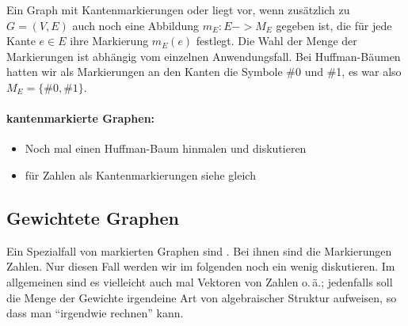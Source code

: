 Ein Graph mit Kantenmarkierungen oder  liegt vor, wenn zusätzlich zu
$G=(V,E)$ auch noch eine Abbildung $m_E:E->M_E$ gegeben ist, die für
jede Kante $e\in E$ ihre Markierung $m_E(e)$ festlegt.
% 
Die Wahl der Menge der Markierungen ist abhängig vom einzelnen
Anwendungsfall.
% 
Bei Huffman-Bäumen hatten wir als Markierungen an den Kanten die
Symbole \#0 und \#1, es war also $M_E=\{\#0,\#1\}$.
% 
\begin{tutorium} 
  \paragraph{kantenmarkierte Graphen:}
  \begin{itemize}
  \item Noch mal einen Huffman-Baum hinmalen und diskutieren
  \item für Zahlen als Kantenmarkierungen siehe gleich
  \end{itemize}
\end{tutorium}

\begin{extract*}
  \subsection{Gewichtete Graphen}
\end{extract*}
\label{subsub:gewichtete-graphen}

Ein Spezialfall von markierten Graphen sind
.
% 
Bei ihnen sind die Markierungen \zB Zahlen.
% 
Nur diesen Fall werden wir im folgenden noch ein wenig diskutieren.
% 
Im allgemeinen sind es vielleicht auch mal Vektoren von Zahlen o.\,ä.;
jedenfalls soll die Menge der Gewichte irgendeine Art von
algebraischer Struktur aufweisen, so dass man "`irgendwie rechnen"'
kann.

